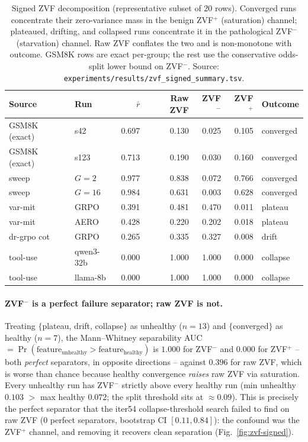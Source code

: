 \begin{table}[htbp]
\centering
\small
\setlength{\tabcolsep}{4pt}
\begin{tabular}{llrrrrl}
\hline
Source & Run & $\bar r$ & Raw ZVF & ZVF$^-$ & ZVF$^+$ & Outcome \\
\hline
GSM8K (exact)   & s42      & 0.697 & 0.130 & 0.025 & 0.105 & converged \\
GSM8K (exact)   & s123     & 0.713 & 0.190 & 0.030 & 0.160 & converged \\
sweep           & $G{=}2$  & 0.977 & 0.838 & 0.072 & 0.766 & converged \\
sweep           & $G{=}16$ & 0.984 & 0.631 & 0.003 & 0.628 & converged \\
var-mit         & GRPO     & 0.391 & 0.481 & 0.470 & 0.011 & plateau \\
var-mit         & AERO     & 0.428 & 0.220 & 0.202 & 0.018 & plateau \\
dr-grpo cot     & GRPO     & 0.265 & 0.335 & 0.327 & 0.008 & drift \\
tool-use        & qwen3-32b& 0.000 & 1.000 & 1.000 & 0.000 & collapse \\
tool-use        & llama-8b & 0.000 & 1.000 & 1.000 & 0.000 & collapse \\
\hline
\end{tabular}
\caption{Signed ZVF decomposition (representative subset of 20 rows).
Converged runs concentrate their zero-variance mass in the benign
ZVF$^+$ (saturation) channel; plateaued, drifting, and collapsed runs
concentrate it in the pathological ZVF$^-$ (starvation) channel. Raw ZVF
conflates the two and is non-monotone with outcome. GSM8K rows are exact
per-group; the rest use the conservative odds-split lower bound on
ZVF$^-$. Source:
\texttt{experiments/results/zvf\_signed\_summary.tsv}.}
\label{tab:zvf-signed}
\end{table}

\paragraph{ZVF$^-$ is a perfect failure separator; raw ZVF is not.}
Treating $\{$plateau, drift, collapse$\}$ as unhealthy ($n{=}13$) and
$\{$converged$\}$ as healthy ($n{=}7$), the Mann--Whitney separability
AUC $=\Pr(\text{feature}_{\text{unhealthy}}{>}\text{feature}_{\text{healthy}})$
is $1.000$ for ZVF$^-$ and $0.000$ for ZVF$^+$ -- both \emph{perfect}
separators, in opposite directions -- against $0.396$ for raw ZVF, which
is worse than chance because healthy convergence \emph{raises} raw ZVF via
saturation. Every unhealthy run has ZVF$^-$ strictly above every healthy
run (min unhealthy $0.103$ $>$ max healthy $0.072$; the split threshold
sits at $\approx 0.09$). This is precisely the perfect separator that the
iter54 collapse-threshold search failed to find on raw ZVF (0 perfect
separators, bootstrap CI $[0.11,0.84]$): the confound was the ZVF$^+$
channel, and removing it recovers clean separation
(Fig.~\ref{fig:zvf-signed}).

